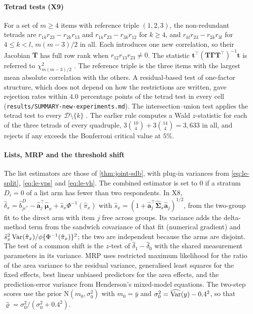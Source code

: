 \paragraph{Tetrad tests (X9)}
For a set of $m\ge4$ items with reference triple $(1,2,3)$, the non-redundant tetrads are $r_{1k}r_{23}-r_{2k}r_{13}$ and $r_{1k}r_{23}-r_{3k}r_{12}$ for $k\ge4$, and $r_{kl}r_{23}-r_{2k}r_{3l}$ for $4\le k<l$, $m(m-3)/2$ in all. Each introduces one new correlation, so their Jacobian $\bm T$ has full row rank when $r_{12}r_{13}r_{23}\neq0$. The statistic $\bm t^\top(\bm T\bm\Gamma\bm T^\top)^{-1}\bm t$ is referred to $\chi^2_{m(m-3)/2}$ \citep{bollen1993tetrad}. The reference triple is the three items with the largest mean absolute correlation with the others. A residual-based test of one-factor structure, which does not depend on how the restrictions are written, gave rejection rates within $4.0$ percentage points of the tetrad test in every cell (\texttt{results/SUMMARY-new-experiments.md}). The intersection--union test applies the tetrad test to every $\mathcal D\setminus\{k\}$ \citep{berger1982}. The earlier rule computes a Wald $z$-statistic for each of the three tetrads of every quadruple, $3\binom{10}{4}+3\binom{14}{4}=3{,}633$ in all, and rejects if any exceeds the Bonferroni critical value at $5\%$.

\paragraph{Lists, MRP and the threshold shift}
The list estimators are those of \cref{thm:joint-sdb}, with plug-in variances from \eqref{eq:le-split}, \eqref{eq:le-vps} and \eqref{eq:le-vh}. The combined estimator is set to $0$ if a stratum $D_i=0$ of a list arm has fewer than two respondents. In X8, $\hat\delta_x=\hat b^{D}_{jc^*}-\hat{\bm a}_j^\top\hat{\bm\mu}_x+\hat s_x\Phi^{-1}(\hat\pi_x)$ with $\hat s_x=(1+\hat{\bm a}_j^\top\hat{\bm\Sigma}_x\hat{\bm a}_j)^{1/2}$, from the two-group fit to the direct arm with item $j$ free across groups. Its variance adds the delta-method term from the sandwich covariance of that fit (numerical gradient) and $\hat s_x^2\operatorname{Var}(\hat\pi_x)/\phi\{\Phi^{-1}(\hat\pi_x)\}^2$; the two are independent because the arms are disjoint. The test of a common shift is the $z$-test of $\hat\delta_1-\hat\delta_0$ with the shared measurement parameters in its variance. MRP uses restricted maximum likelihood for the ratio of the area variance to the residual variance, generalised least squares for the fixed effects, best linear unbiased predictors for the area effects, and the prediction-error variance from Henderson's mixed-model equations. The two-step scores use the prior $\mathrm N(m_0,\sigma_0^2)$ with $m_0=\bar y$ and $\sigma_0^2=\widehat{\operatorname{Var}}(y)-0.4^2$, so that $\hat\varrho=\sigma_0^2/(\sigma_0^2+0.4^2)$.


